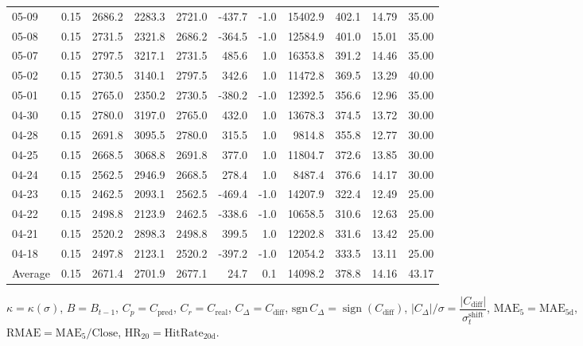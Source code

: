 \begin{threeparttable}
{\begin{tabular}{lrrrrrrrrrr}
05-09 & 0.15 & 2686.2 & 2283.3 & 2721.0 & -437.7 & -1.0 & 15402.9 & 402.1 & 14.79 & 35.00 \\
05-08 & 0.15 & 2731.5 & 2321.8 & 2686.2 & -364.5 & -1.0 & 12584.9 & 401.0 & 15.01 & 35.00 \\
05-07 & 0.15 & 2797.5 & 3217.1 & 2731.5 & 485.6 & 1.0 & 16353.8 & 391.2 & 14.46 & 35.00 \\
05-02 & 0.15 & 2730.5 & 3140.1 & 2797.5 & 342.6 & 1.0 & 11472.8 & 369.5 & 13.29 & 40.00 \\
05-01 & 0.15 & 2765.0 & 2350.2 & 2730.5 & -380.2 & -1.0 & 12392.5 & 356.6 & 12.96 & 35.00 \\
04-30 & 0.15 & 2780.0 & 3197.0 & 2765.0 & 432.0 & 1.0 & 13678.3 & 374.5 & 13.72 & 30.00 \\
04-28 & 0.15 & 2691.8 & 3095.5 & 2780.0 & 315.5 & 1.0 & 9814.8 & 355.8 & 12.77 & 30.00 \\
04-25 & 0.15 & 2668.5 & 3068.8 & 2691.8 & 377.0 & 1.0 & 11804.7 & 372.6 & 13.85 & 30.00 \\
04-24 & 0.15 & 2562.5 & 2946.9 & 2668.5 & 278.4 & 1.0 & 8487.4 & 376.6 & 14.17 & 30.00 \\
04-23 & 0.15 & 2462.5 & 2093.1 & 2562.5 & -469.4 & -1.0 & 14207.9 & 322.4 & 12.49 & 25.00 \\
04-22 & 0.15 & 2498.8 & 2123.9 & 2462.5 & -338.6 & -1.0 & 10658.5 & 310.6 & 12.63 & 25.00 \\
04-21 & 0.15 & 2520.2 & 2898.3 & 2498.8 & 399.5 & 1.0 & 12202.8 & 331.6 & 13.42 & 25.00 \\
04-18 & 0.15 & 2497.8 & 2123.1 & 2520.2 & -397.2 & -1.0 & 12054.2 & 333.5 & 13.11 & 25.00 \\
Average & 0.15 & 2671.4 & 2701.9 & 2677.1 & 24.7 & 0.1 & 14098.2 & 378.8 & 14.16 & 43.17 \\
\bottomrule
\end{tabular}
}%
\begin{tablenotes}\footnotesize
\item $\kappa=\kappa(\sigma)$, $B=B_{t-1}$, $C_p=C_{\text{pred}}$, $C_r=C_{\text{real}}$, $C_\Delta=C_{\text{diff}}$, $\mathrm{sgn}\,C_\Delta=\operatorname{sign}(C_{\text{diff}})$, $|C_\Delta|/\sigma=\dfrac{|C_{\text{diff}}|}{\sigma_t^{\text{shift}}}$, $\mathrm{MAE}_5=\mathrm{MAE}_{5\text{d}}$, $\mathrm{RMAE}= \mathrm{MAE}_5 / \text{Close}$, $\mathrm{HR}_{20}=\mathrm{HitRate}_{20\text{d}}$.
\end{tablenotes}
\end{threeparttable}
\endgroup